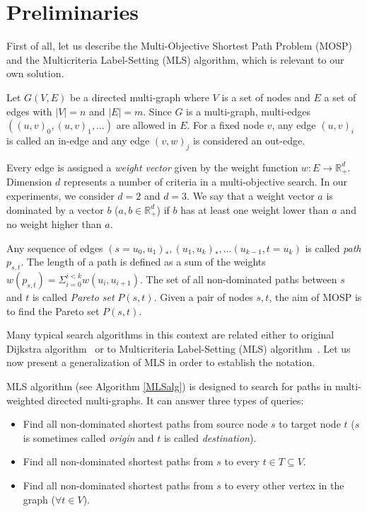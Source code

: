
\section{Preliminaries}
\label{secPreliminaries}

First of all, let us describe the Multi-Objective Shortest Path Problem (MOSP) and the Multicriteria Label-Setting (MLS) algorithm, which is relevant to our own solution.

Let $G(V,E)$ be a directed multi-graph where $V$ is a set of nodes and $E$ a set
of edges with $|V| = n$ and $|E| = m$. Since $G$ is a multi-graph, multi-edges
$((u,v)_0,(u,v)_1,\dots)$ are allowed in $E$. For a fixed node $v$, any edge $(u,v)_i$ is called an in-edge and any edge $(v,w)_j$ is considered an out-edge.

Every edge is assigned a \emph{weight vector} given by the weight function $w: E \rightarrow \mathbb{R}_+^d$. Dimension $d$ represents a number of criteria in a multi-objective search. 
In our experiments, we consider $d=2$ and $d=3$.
We say that a weight vector $a$ is dominated by a vector $b$ ($a,b \in \mathbb{R}_+^d$) if
$b$ has at least one weight lower than $a$ and no weight higher than $a$. 

Any sequence of edges $(s \! = \! u_0,u_1)_*,(u_1,u_k)_*,\dots(u_{k-1},t \! = \! u_k)$ is called
\emph{path} $p_{s,t}$. The length of a path is defined as a sum of the weights 
$w(p_{s,t}) = \Sigma_{i=0}^{i<k} w(u_i,u_{i+1})$. The set of all non-dominated paths between $s$ and $t$ is called {\em Pareto set}
$P(s,t)$. Given a pair of nodes $s,t$, the aim of MOSP is to find the Pareto set $P(s,t)$.

\vskip 5mm

Many typical search algorithms in this context are related either to original Dijkstra algorithm~\cite{dijkstra1959note} or to Multicriteria Label-Setting (MLS) algorithm~\cite{martins1984multicriteria}. Let us now present a generalization of MLS in order to establish the notation.

MLS algorithm (see Algorithm \ref{MLSalg}) is designed to search for paths in multi-weighted directed multi-graphs. It can answer three types of queries:
\begin{itemize}
\item Find all non-dominated shortest paths from source node $s$ to target node $t$ ($s$ is sometimes called {\em origin} and $t$ is called {\em destination}).
\item Find all non-dominated shortest paths from $s$ to every $t \in T \subseteq V$.
\item Find all non-dominated shortest paths from $s$ to every other vertex in the graph ($\forall t \in V$).
\end{itemize}

